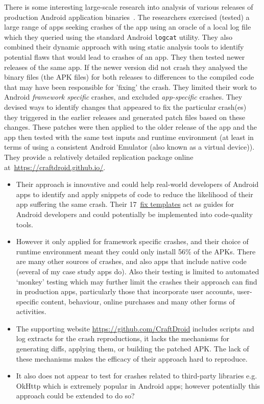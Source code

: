 There is some interesting large-scale research into analysis of various releases of production Android application binaries~. The researchers exercised (tested) a large range of apps seeking crashes of the app using an oracle of a local log file which they queried using the standard Android \texttt{logcat} utility. They also combined their dynamic approach with using static analysis tools to identify potential flaws that would lead to crashes of an app. They then tested newer releases of the same app. If the newer version did not crash they analysed the binary files (the APK files) for both releases to differences to the compiled code that may have been responsible for 'fixing' the crash. They limited their work to Android \emph{framework specific} crashes, and excluded \emph{app-specific} crashes. They devised ways to identify changes that appeared to fix the particular crash(es) they triggered in the earlier releases and generated patch files based on these changes. These patches were then applied to the older release of the app and the app then tested with the same test inputs and runtime environment (at least in terms of using a consistent Android Emulator (also known as a virtual device)). They provide a relatively detailed replication package online at~\url{https://craftdroid.github.io/}.

\begin{itemize}
    \item Their approach is innovative and could help real-world developers of Android apps to identify and apply snippets of code to reduce the likelihood of their app suffering the same crash. Their 17~\href{https://github.com/CraftDroid/ExpData/tree/master/Fix_Templates}{fix templates} act as guides for Android developers and could potentially be implemented into code-quality tools.
    \item However it only applied for framework specific crashes, and their choice of runtime environment meant they could only install 56\% of the APKs. There are many other sources of crashes, and also apps that include native code (several of my case study apps do). Also their testing is limited to automated `monkey' testing which may further limit the crashes their approach can find in production apps, particularly those that incorporate user accounts, user-specific content, behaviour, online purchases and many other forms of activities.
    \item The supporting website \url{https://github.com/CraftDroid} includes scripts and log extracts for the crash reproductions, it lacks the mechanisms for generating diffs, applying them, or building the patched APK. The lack of these mechanisms makes the efficacy of their approach hard to reproduce.
    \item It also does not appear to test for crashes related to third-party libraries e.g. OkHttp which is extremely popular in Android apps; however potentially this approach could be extended to do so?
\end{itemize}

